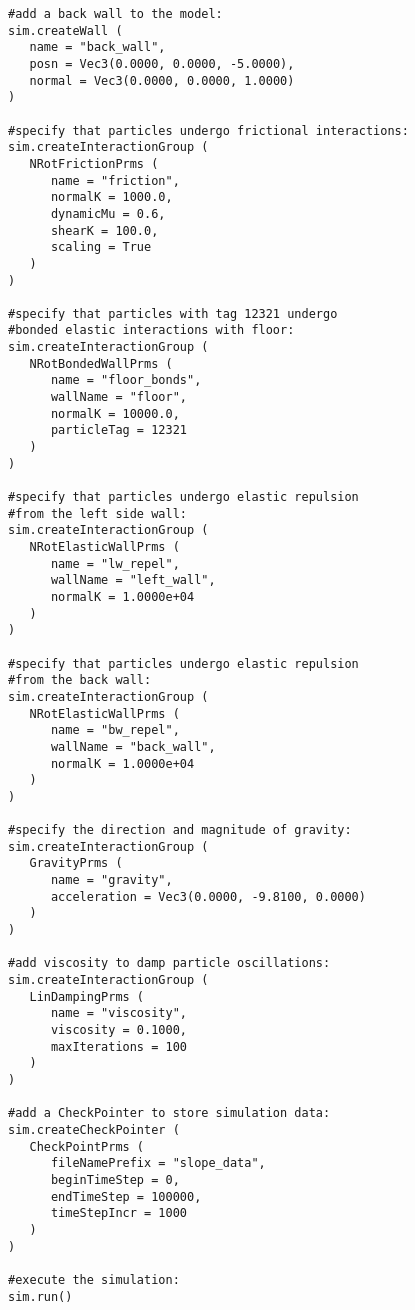 \begin{verbatim}
#add a back wall to the model:
sim.createWall (
   name = "back_wall",
   posn = Vec3(0.0000, 0.0000, -5.0000),
   normal = Vec3(0.0000, 0.0000, 1.0000)
)

#specify that particles undergo frictional interactions:
sim.createInteractionGroup (
   NRotFrictionPrms (
      name = "friction",
      normalK = 1000.0,
      dynamicMu = 0.6,
      shearK = 100.0,
      scaling = True
   )
)

#specify that particles with tag 12321 undergo 
#bonded elastic interactions with floor:
sim.createInteractionGroup (
   NRotBondedWallPrms (
      name = "floor_bonds",
      wallName = "floor",
      normalK = 10000.0,
      particleTag = 12321
   )
)

#specify that particles undergo elastic repulsion
#from the left side wall:
sim.createInteractionGroup (
   NRotElasticWallPrms (
      name = "lw_repel",
      wallName = "left_wall",
      normalK = 1.0000e+04
   )
)

#specify that particles undergo elastic repulsion
#from the back wall:
sim.createInteractionGroup (
   NRotElasticWallPrms (
      name = "bw_repel",
      wallName = "back_wall",
      normalK = 1.0000e+04
   )
)

#specify the direction and magnitude of gravity:
sim.createInteractionGroup (
   GravityPrms (
      name = "gravity",
      acceleration = Vec3(0.0000, -9.8100, 0.0000)
   )
)

#add viscosity to damp particle oscillations:
sim.createInteractionGroup (
   LinDampingPrms (
      name = "viscosity",
      viscosity = 0.1000,
      maxIterations = 100
   )
)

#add a CheckPointer to store simulation data:
sim.createCheckPointer (
   CheckPointPrms (
      fileNamePrefix = "slope_data",
      beginTimeStep = 0,
      endTimeStep = 100000,
      timeStepIncr = 1000
   )
)

#execute the simulation:
sim.run()
\end{verbatim}

